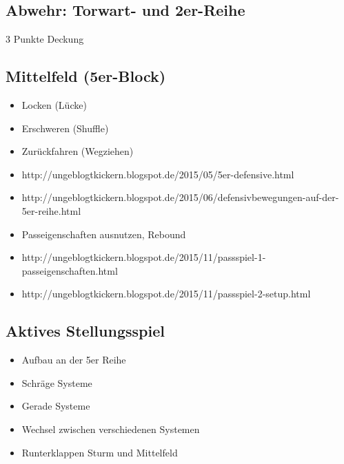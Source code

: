 \subsection{Abwehr: Torwart- und 2er-Reihe}
\label{taktik:defensive:halten}

3 Punkte Deckung


\subsection{Mittelfeld (5er-Block)}
\label{taktik:defensive:5erblock}

\begin{itemize}
    \item Locken (Lücke)
    \item Erschweren (Shuffle)
    \item Zurückfahren (Wegziehen)
    \item http://ungeblogtkickern.blogspot.de/2015/05/5er-defensive.html
    \item http://ungeblogtkickern.blogspot.de/2015/06/defensivbewegungen-auf-der-5er-reihe.html
    \item Passeigenschaften ausnutzen, Rebound
    \item http://ungeblogtkickern.blogspot.de/2015/11/passspiel-1-passeigenschaften.html
    \item http://ungeblogtkickern.blogspot.de/2015/11/passspiel-2-setup.html
\end{itemize}  



\subsection{Aktives Stellungsspiel}
\label{taktik:defensive:aktivesstellungsspiel}

\begin{itemize}
    \item Aufbau an der 5er Reihe
    \item Schräge Systeme
    \item Gerade Systeme
    \item Wechsel zwischen verschiedenen Systemen
    \item Runterklappen Sturm und Mittelfeld
\end{itemize}

